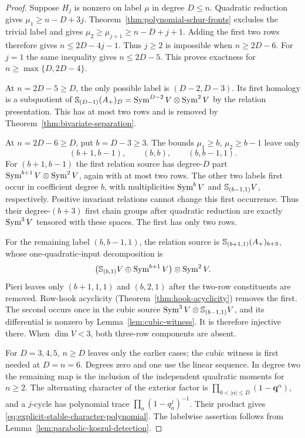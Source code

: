\begin{proof}
Suppose $H_j$ is nonzero on label $\mu$ in degree $D\le n$.
Quadratic reduction gives $\mu_1\ge n-D+3j$.
Theorem~\ref{thm:polynomial-schur-fronts} excludes the trivial label
and gives $\mu_2\ge\mu_{j+1}\ge n-D+j+1$.
Adding the first two rows therefore gives $n\le2D-4j-1$.
Thus $j\ge2$ is impossible when $n\ge2D-6$.
For $j=1$ the same inequality gives $n\le2D-5$.
This proves exactness for $n\ge\max\{D,2D-4\}$.

At $n=2D-5\ge D$, the only possible label is $(D-2,D-3)$.
Its first homology is a subquotient of
$\mathbb S_{(D-1)}(A_+)_D=\operatorname{Sym}^{D-2}V\otimes\operatorname{Sym}^2V$ by the
relation presentation. This has at most two rows and is removed by
Theorem~\ref{thm:bivariate-separation}.

At $n=2D-6\ge D$, put $b=D-3\ge3$. The bounds
$\mu_1\ge b$, $\mu_2\ge b-1$ leave only
\[
               (b+1,b-1),\qquad(b,b),\qquad(b,b-1,1).
\]
For $(b+1,b-1)$ the first relation source has degree-$D$ part
$\operatorname{Sym}^{b+1}V\otimes\operatorname{Sym}^2V$, again with at most two rows.
The other two labels first occur in coefficient degree $b$, with
multiplicities $\operatorname{Sym}^bV$ and $\mathbb S_{(b-1,1)}V$, respectively.
Positive invariant relations cannot change this first occurrence.
Thus their degree-$(b+3)$ first chain groups after quadratic reduction
are exactly $\operatorname{Sym}^3V$ tensored with these spaces. The first has only
two rows.

For the remaining label $(b,b-1,1)$, the relation source is
$\mathbb S_{(b+1,1)}(A_+)_{b+3}$, whose one-quadratic-input decomposition is
\[
       \bigl(\mathbb S_{(b,1)}V\oplus\operatorname{Sym}^{b+1}V\bigr)
                                      \otimes\operatorname{Sym}^2V.
\]
Pieri leaves only $(b+1,1,1)$ and $(b,2,1)$ after the two-row
constituents are removed. Row-hook acyclicity
(Theorem~\ref{thm:hook-acyclicity}) removes the first. The second occurs
once in the cubic source
$\operatorname{Sym}^3V\otimes\mathbb S_{(b-1,1)}V$, and its differential is nonzero
by Lemma~\ref{lem:cubic-witness}. It is therefore injective there.
When $\dim V<3$, both three-row components are absent.

For $D=3,4,5$, $n\ge D$ leaves only the earlier cases; the cubic
witness is first needed at $D=n=6$. Degrees zero and one use the
linear sequence. In degree two the remaining map is the inclusion
of the independent quadratic moments for $n\ge2$.
The alternating character of the exterior factor is
$\prod_{0<|\alpha|\le D}(1-\mathbf q^\alpha)$, and a $j$-cycle
has polynomial trace $\prod_a(1-q_a^j)^{-1}$. Their product gives
\eqref{eq:explicit-stable-character-polynomial}.
The labelwise assertion follows from Lemma~\ref{lem:parabolic-koszul-detection}.
\end{proof}

